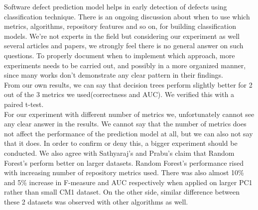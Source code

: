 Software defect prediction model helps in early detection of defects using classification technique. There is an ongoing discussion about when to use which metrics, algorithms, repository features and so on, for building classification models. We're not experts in the field but considering our experiment as well several articles and papers, we strongly feel there is no general answer on such questions. To properly document when to implement which approach, more experiments needs to be carried out, and possibly in a more organized manner, since many works don't demonstrate any clear pattern in their findings.\\
From our own results, we can say that decision trees perform slightly better for 2 out of the 3 metrics we used(correctness and AUC). We verified this with a paired t-test. \\ For our experiment with different number of metrics we, unfortunately cannot see any clear answer in the results. We cannot say that the number of metrics does not affect the performance of the prediction model at all, but we can also not say that it does. In order to confirm or deny this, a bigger experiment should be conducted. 
We also agree with Sathyaraj's and Prabu's claim\cite{sathyaraj2015approach} that Random Forest's perform better on larger datasets. Random Forest's performance rised with increasing number of repository metrics used. There was also almost 10\% and 5\% increase in F-measure and AUC respectively when applied on larger PC1 rather than small CM1 dataset. On the other side, similar difference between these 2 datasets was observed with other algorithms as well.